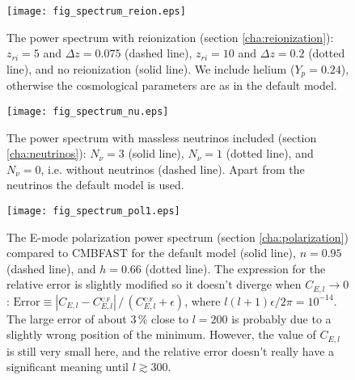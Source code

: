 \documentclass[twocolumn,nofootinbib,amsmath,amssymb]{revtex4}
\begin{document}
\begin{widetext}
\begin{figure}[!h]
  \begin{center}
    \texttt{[image: fig\_spectrum\_reion.eps]}
  \end{center}
  \vspace{-6mm}
  \caption{The power spectrum with reionization (section
  \ref{cha:reionization}): $z_{ri} = 5$ and $\Delta z = 0.075$ (dashed line),
  $z_{ri} = 10$ and $\Delta z = 0.2$ (dotted line), and no reionization
  (solid line). We include helium ($Y_p = 0.24$), otherwise the cosmological
  parameters are as in the default model.}
  \label{fig:powerspectrum_reion}
\end{figure}
\begin{figure}[!h]
  \begin{center}
    \texttt{[image: fig\_spectrum\_nu.eps]}
  \end{center}
  \vspace{-6mm}
  \caption{The power spectrum with massless neutrinos included (section
  \ref{cha:neutrinos}): $N_\nu = 3$ (solid line), $N_\nu = 1$ (dotted line),
  and $N_\nu = 0$, i.e. without neutrinos (dashed line). Apart from the
  neutrinos the default model is used.}
  \label{fig:powerspectrum_neutrinos}
\end{figure}
\begin{figure}[!h]
  \begin{center}
    \texttt{[image: fig\_spectrum\_pol1.eps]}
  \end{center}
  \vspace{-6mm}
  \caption{The E-mode polarization power spectrum (section
  \ref{cha:polarization}) compared to CMBFAST for the default model (solid
  line), $n = 0.95$ (dashed line), and $h = 0.66$ (dotted line). The expression
  for the relative error is slightly modified so it doesn't diverge when
  $C_{E,l} \to 0$: $\mathrm{Error} \equiv |C_{E,l} -
  C_{E,l}^{_{\mathrm{C.F.}}}| \,/\, (C_{E,l}^{_{\mathrm{C.F.}}}\! + \epsilon)$,
  where $l(l+1) \epsilon / 2\pi = 10^{-14}$. The large error of about
  $3 \,\%$ close to $l = 200$ is probably due to a slightly wrong position of
  the minimum. However, the value of $C_{E,l}$ is still very small here, and
  the relative error doesn't really have a significant meaning until $l \gtrsim
  300$.}
  \label{fig:polarization_power}
\end{figure}

\clearpage


\end{widetext}
\end{document}
